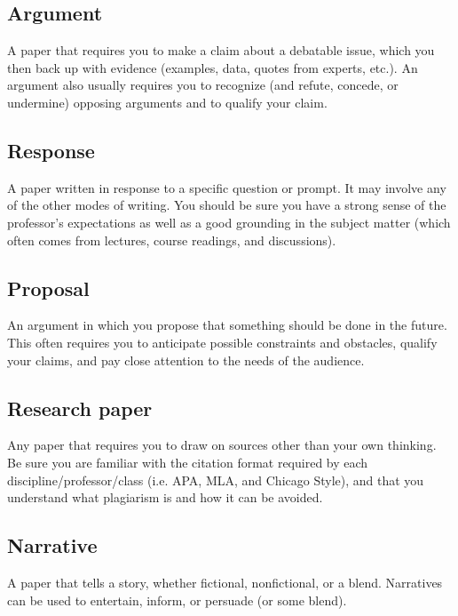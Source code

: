 \subsection{Argument}

A paper that requires you to make a claim about a debatable issue, which you then back up with evidence (examples, data, quotes from experts, etc.). An argument also usually requires you to recognize (and refute, concede, or undermine) opposing arguments and to qualify your claim.

\subsection{Response}

A paper written in response to a specific question or prompt. It may involve any of the other modes of writing. You should be sure you have a strong sense of the professor's expectations as well as a good grounding in the subject matter (which often comes from lectures, course readings, and discussions).

\subsection{Proposal}

An argument in which you propose that something should be done in the future. This often requires you to anticipate possible constraints and obstacles, qualify your claims, and pay close attention to the needs of the audience.

\subsection{Research paper}

Any paper that requires you to draw on sources other than your own thinking. Be sure you are familiar with the citation format required by each discipline/professor/class (i.e. APA, MLA, and Chicago Style), and that you understand what plagiarism is and how it can be avoided.

\subsection{Narrative}

A paper that tells a story, whether fictional, nonfictional, or a blend. Narratives can be used to entertain, inform, or persuade (or some blend).
